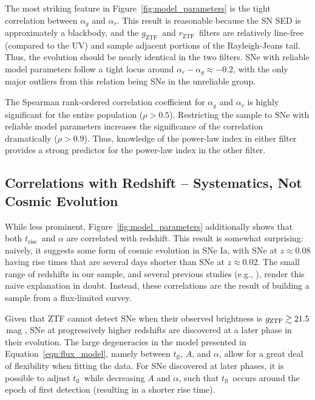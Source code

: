 \documentclass[twocolumn]{./aastex63}
\newcommand{\rztf}{$r_\mathrm{ZTF}$}
\newcommand{\gztf}{$g_\mathrm{ZTF}$}
\newcommand{\tfl}{$t_\mathrm{fl}$}
\newcommand{\trise}{$t_\mathrm{rise}$}
\begin{document}
The most striking feature in Figure~\ref{fig:model_parameters} is the tight
correlation between $\alpha_g$ and $\alpha_r$. This result is
reasonable because the SN SED is approximately a
blackbody, and the \gztf\ and \rztf\ filters are relatively line-free
(compared to the UV) and sample adjacent portions of the Rayleigh-Jeans tail.
Thus, the evolution should be nearly identical in the two filters. SNe with
reliable model parameters follow a tight locus around $\alpha_r - \alpha_g
\approx -0.2$, with the only major outliers from this relation being SNe in
the unreliable group.

The Spearman rank-ordered correlation coefficient for $\alpha_g$ and
$\alpha_r$ is highly significant for the entire population ($\rho > 0.5$).
Restricting the sample to SNe with reliable model parameters increases the
significance of the correlation dramatically ($\rho > 0.9$). Thus, knowledge
of the power-law index in either filter provides a strong predictor for the
power-law index in the other filter.

\subsection{Correlations with Redshift -- Systematics, Not Cosmic Evolution}\label{sec:redshift_correlations}

While less prominent, Figure~\ref{fig:model_parameters} additionally shows
that both \trise\ and $\alpha$ are correlated with redshift. This result is
somewhat surprising: naively, it suggests some form of cosmic evolution in SNe
Ia, with SNe at $z \approx 0.08$ having rise times that are several days
shorter than SNe at $z \approx 0.02$. The small range of redshifts in our
sample, and several previous studies (e.g.,
\citealt{Aldering00,Conley06,Gonzalez-Gaitan12,Jones19}), render this naive
explanation in doubt. Instead, these correlations are the result of building a
sample from a flux-limited survey.

Given that ZTF cannot detect SNe when their observed brightness is
$g_\mathrm{ZTF} \gtrsim 21.5$\,mag \citep{Masci19,Bellm19}, SNe at progressively
higher redshifts are discovered at a later phase in their evolution. The large
degeneracies in the model presented in Equation~\ref{eqn:flux_model}, namely
between \tfl, $A$, and $\alpha$, allow for a great deal of flexibility when
fitting the data. For SNe discovered at later phases, it is possible to adjust
\tfl\ while decreasing $A$ and $\alpha$, such that \tfl\ occurs around the
epoch of first detection (resulting in a shorter rise time).
\end{document}

